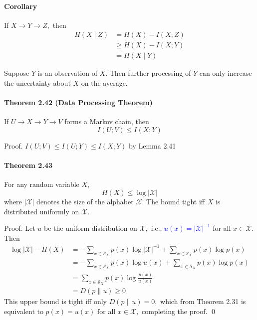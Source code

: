 \documentclass[8pt]{article}
\begin{document}
\begin{tcolorbox}
\paragraph{Corollary}
If $X \rightarrow Y \rightarrow Z,$ then
$$
\begin{aligned}
H(X \mid Z) &=H(X)-I(X ; Z) \\
& \geq H(X)-I(X ; Y) \\
&=H(X \mid Y)
\end{aligned}
$$
\end{tcolorbox}
Suppose $Y$ is an observation of $X .$ Then further processing of $Y$ can only increase the uncertainty about $X$ on the average.

\begin{tcolorbox}
\paragraph{Theorem 2.42 (Data Processing Theorem)} If $U \rightarrow X \rightarrow Y \rightarrow V$ forms a Markov chain, then
$$
I(U ; V) \leq I(X ; Y)
$$
\end{tcolorbox}
Proof. $I(U ; V) \leq I(U ; Y) \leq I(X; Y)$ by Lemma 2.41

\begin{tcolorbox}
\paragraph{Theorem 2.43} For any random variable $X$,
$$
H(X) \leq \log |\mathcal{X}|
$$
where $|\mathcal{X}|$ denotes the size of the alphabet $\mathcal{X}$. The bound tight iff $X$ is distributed uniformly on $\mathcal{X}$.
\end{tcolorbox}

Proof. Let $u$ be the uniform distribution on $\mathcal{X},$ i.e., \textcolor{blue}{$u(x)=|\mathcal{X}|^{-1}$} for all $x \in \mathcal{X} .$ Then
$$
\begin{aligned}
\log |\mathcal{X}|-H(X) &=-\sum_{x \in \mathcal{S}_{X}} p(x) \log |\mathcal{X}|^{-1}+\sum_{x \in \mathcal{S}_{X}} p(x) \log p(x) \\
&=-\sum_{x \in \mathcal{S}_{X}} p(x) \log u(x)+\sum_{x \in \mathcal{S}_{X}} p(x) \log p(x) \\
&=\sum_{x \in \mathcal{S}_{X}} p(x) \log \frac{p(x)}{u(x)} \\
&=D(p \| u) \geq 0
\end{aligned}
$$
This upper bound is tight iff only $D(p \| u)=0,$ which from Theorem 2.31 is equivalent to $p(x)=u(x)$ for all $x \in \mathcal{X},$ completing the proof. \qed
\end{document}
